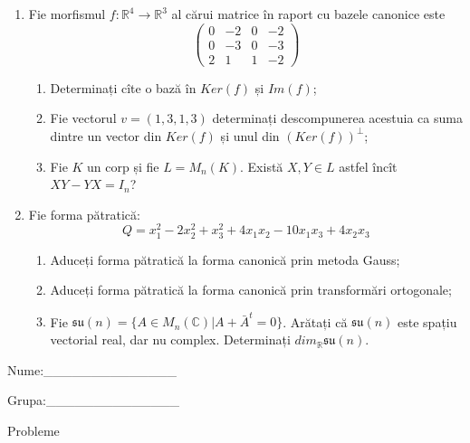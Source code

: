 \documentclass{article}
\begin{document}
\begin{enumerate}
 \item Fie morfismul $f:\mathbb{R}^4 \to \mathbb{R}^3$ al cărui matrice în raport cu bazele canonice este
$$\begin{pmatrix}
0&-2&0&-2\\
0&-3&0&-3\\
2&1&1&-2
\end{pmatrix}$$

\begin{enumerate}
\item Determinați cîte o bază în $Ker(f)$ și $Im(f)$;
\item Fie vectorul $v=(1,3,1,3)$ determinați descompunerea acestuia ca suma dintre un vector din $Ker(f)$ și unul din $(Ker(f))^\perp$;
\item Fie $K$ un corp și fie $L=M_n(K)$. Există $X,Y \in L$ astfel încît $XY-YX=I_n$?  
\end{enumerate}
\item Fie forma pătratică:
$$Q= x_1^2-2x_2^2+x_3^2+4x_1x_2-10x_1x_3+4x_2x_3$$

\begin{enumerate}
\item Aduceți forma pătratică la forma canonică prin metoda Gauss;
\item Aduceți forma pătratică la forma canonică prin transformări ortogonale;
\item Fie $\mathfrak{su}(n)=\{ A \in M_n(\mathbb{C}) | A+\bar{A}^t=0\}$. Arătați că $\mathfrak{su}(n)$ este spațiu vectorial real, dar nu complex.
Determinați $dim_{\mathbb{R}}\mathfrak{su}(n)$.
\end{enumerate}
\end{enumerate}
\newpage
\begin{flushright}
Nume:\_\_\_\_\_\_\_\_\_\_\_\_\_\_
 
 
Grupa:\_\_\_\_\_\_\_\_\_\_\_\_\_\_
\end{flushright}
\begin{center}
\vspace{2cm}
{\Large Probleme}
\vspace{2cm}
\end{center}
\end{document}
